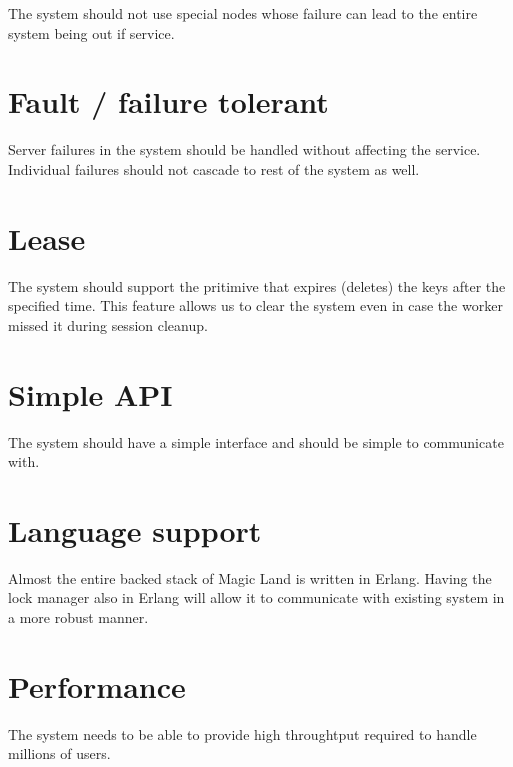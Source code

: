 
The system should not use special nodes whose failure can lead to the
entire system being out if service.

\section{Fault / failure tolerant}


Server failures in the system should be handled without affecting the service.
Individual failures should not cascade to rest of the system as well.

\section{Lease}


The system should support the pritimive that expires (deletes) the keys after 
the specified time. This feature allows us to clear the system even in case
the worker missed it during session cleanup.

\section{Simple API}


The system should have a simple interface and should be simple to communicate 
with.

\section{Language support}


Almost the entire backed stack of Magic Land is written in Erlang. Having the
lock manager also in Erlang will allow it to communicate with existing
system in a more robust manner.

\section{Performance}


The system needs to be able to provide high throughtput required to handle
millions of users.

